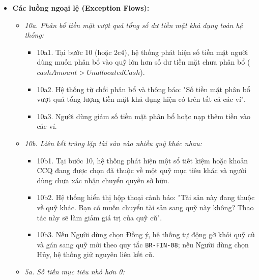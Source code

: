 \documentclass[11pt,a4paper]{article}
\providecommand{\tightlist}{
  \setlength{\itemsep}{0pt}\setlength{\parskip}{0pt}}
\begin{document}
\begin{itemize}
\begin{itemize}
\begin{itemize}
      \begin{itemize}
      \tightlist
      \item
        Nếu chuyển tiền mặt:
        \[
        Cash_A = Cash_A - amount;\qquad Cash_B = Cash_B + amount
        \]
      \item
        Nếu chuyển sổ tiết kiệm hoặc CCQ: Cập nhật trường
        \texttt{fund\ =\ fundCode\_B} cho tài sản đó.
      \end{itemize}
    \item
      2c6. Hệ thống tính toán lại \(Total\) và \(Process\) của cả hai
      Quỹ A và Quỹ B. Tổng tài sản toàn hệ thống được bảo toàn 100\%.
    \item
      2c7. Hệ thống hiển thị thông báo tái phân bổ hoàn tất kèm bảng so
      sánh trước và sau khi tái cơ cấu.
    \end{itemize}
  \end{itemize}
\item
  \textbf{Các luồng ngoại lệ (Exception Flows):}

  \begin{itemize}
  \tightlist
  \item
    \emph{10a. Phân bổ tiền mặt vượt quá tổng số dư tiền mặt khả dụng
    toàn hệ thống:}

    \begin{itemize}
    \tightlist
    \item
      10a1. Tại bước 10 (hoặc 2c4), hệ thống phát hiện số tiền mặt người
      dùng muốn phân bổ vào quỹ lớn hơn số dư tiền mặt chưa phân bổ
      (\(cashAmount > UnallocatedCash\)).
    \item
      10a2. Hệ thống từ chối phân bổ và thông báo: "Số tiền mặt phân bổ
      vượt quá tổng lượng tiền mặt khả dụng hiện có trên tất cả các ví".
    \item
      10a3. Người dùng giảm số tiền mặt phân bổ hoặc nạp thêm tiền vào
      các ví.
    \end{itemize}
  \item
    \emph{10b. Liên kết trùng lặp tài sản vào nhiều quỹ khác nhau:}

    \begin{itemize}
    \tightlist
    \item
      10b1. Tại bước 10, hệ thống phát hiện một sổ tiết kiệm hoặc khoản
      CCQ đang được chọn đã thuộc về một quỹ mục tiêu khác và người dùng
      chưa xác nhận chuyển quyền sở hữu.
    \item
      10b2. Hệ thống hiển thị hộp thoại cảnh báo: "Tài sản này đang
      thuộc về quỹ khác. Bạn có muốn chuyển tài sản sang quỹ này không?
      Thao tác này sẽ làm giảm giá trị của quỹ cũ".
    \item
      10b3. Nếu Người dùng chọn Đồng ý, hệ thống tự động gỡ khỏi quỹ cũ
      và gán sang quỹ mới theo quy tắc \texttt{BR-FIN-08}; nếu Người
      dùng chọn Hủy, hệ thống giữ nguyên liên kết cũ.
    \end{itemize}
  \item
    \emph{5a. Số tiền mục tiêu nhỏ hơn 0:}


\end{itemize}
\end{itemize}
\end{document}

